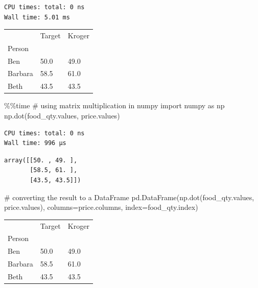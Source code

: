 \documentclass[
  letterpaper,
  DIV=11,
  numbers=noendperiod]{scrreprt}
\newenvironment{Shaded}{\begin{snugshade}}{\end{snugshade}}
\newcommand{\CommentTok}[1]{\textcolor[rgb]{0.37,0.37,0.37}{#1}}
\newcommand{\ImportTok}[1]{\textcolor[rgb]{0.00,0.46,0.62}{#1}}
\newcommand{\NormalTok}[1]{\textcolor[rgb]{0.00,0.23,0.31}{#1}}
\newcommand{\OperatorTok}[1]{\textcolor[rgb]{0.37,0.37,0.37}{#1}}
\begin{document}
\begin{verbatim}
CPU times: total: 0 ns
Wall time: 5.01 ms
\end{verbatim}

\begin{longtable}[]{@{}lll@{}}
\toprule\noalign{}
& Target & Kroger \\
Person & & \\
\midrule\noalign{}
\endhead
\bottomrule\noalign{}
\endlastfoot
Ben & 50.0 & 49.0 \\
Barbara & 58.5 & 61.0 \\
Beth & 43.5 & 43.5 \\
\end{longtable}

\begin{Shaded}
\begin{Highlighting}[]
\OperatorTok{\%\%}\NormalTok{time}
\CommentTok{\# using matrix multiplication in numpy}
\ImportTok{import}\NormalTok{ numpy }\ImportTok{as}\NormalTok{ np}
\NormalTok{np.dot(food\_qty.values, price.values)}
\end{Highlighting}
\end{Shaded}

\begin{verbatim}
CPU times: total: 0 ns
Wall time: 996 μs
\end{verbatim}

\begin{verbatim}
array([[50. , 49. ],
       [58.5, 61. ],
       [43.5, 43.5]])
\end{verbatim}

\begin{Shaded}
\begin{Highlighting}[]
\CommentTok{\# converting the result to a DataFrame}
\NormalTok{pd.DataFrame(np.dot(food\_qty.values, price.values), columns}\OperatorTok{=}\NormalTok{price.columns, index}\OperatorTok{=}\NormalTok{food\_qty.index)}
\end{Highlighting}
\end{Shaded}

\begin{longtable}[]{@{}lll@{}}
\toprule\noalign{}
& Target & Kroger \\
Person & & \\
\midrule\noalign{}
\endhead
\bottomrule\noalign{}
\endlastfoot
Ben & 50.0 & 49.0 \\
Barbara & 58.5 & 61.0 \\
Beth & 43.5 & 43.5 \\
\end{longtable}
\end{document}
